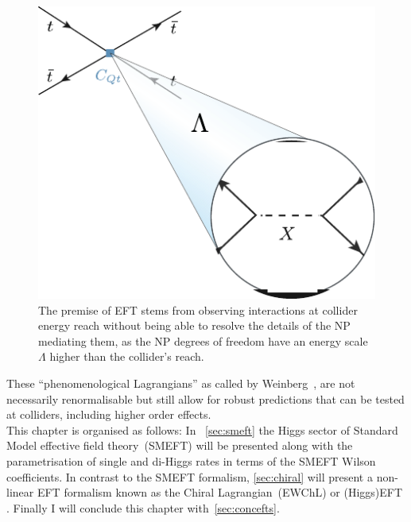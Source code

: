 \begin{figure}[h!]
	\begin{center}
		\includegraphics[width=.4 \linewidth]{figures/EFT}
		\caption{The premise of EFT stems from observing interactions at collider energy reach without being able to resolve the details of the NP mediating them, as the NP degrees of freedom have an energy scale $\Lambda$ higher than the collider's reach. }
		\label{fig:eft}
	\end{center}
\end{figure}
These ``phenomenological Lagrangians'' as called by Weinberg~\cite{WEINBERG1979327}, are not necessarily renormalisable but still allow for robust predictions that can be tested at colliders, including higher order effects. \\
This chapter  is organised as follows:  In ~\autoref{sec:smeft} the Higgs sector of Standard Model effective field theory~(SMEFT) will be presented along with the parametrisation of single and di-Higgs rates in terms of the SMEFT Wilson coefficients. In contrast to the SMEFT formalism, \autoref{sec:chiral} will present a non-linear EFT formalism known as the Chiral Lagrangian~(EWChL) or (Higgs)EFT . Finally I will conclude this chapter with~\autoref{sec:concefts}.
